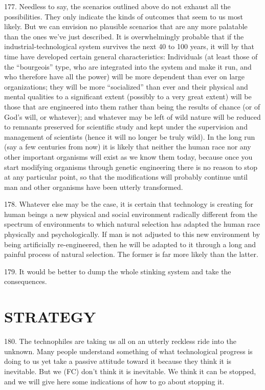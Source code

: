 \documentclass{article}
\begin{document}
177. Needless to say, the scenarios outlined above do not exhaust all the possibilities. They only 
indicate the kinds of outcomes that seem to us most likely. But we can envision no plausible 
scenarios that are any more palatable than the ones we’ve just described. It is overwhelmingly 
probable that if the industrial-technological system survives the next 40 to 100 years, it will by 
that time have developed certain general characteristics: Individuals (at least those of the 
“bourgeois” type, who are integrated into the system and make it run, and who therefore have all 
the power) will be more dependent than ever on large organizations; they will be more “socialized” 
than ever and their physical and mental qualities to a significant extent (possibly to a very great 
extent) will be those that are engineered into them rather than being the results of chance (or of 
God’s will, or whatever); and whatever may be left of wild nature will be reduced to remnants 
preserved for scientific study and kept under the supervision and management of scientists (hence 
it will no longer be truly wild). In the long run (say a few centuries from now) it is likely that 
neither the human race nor any other important organisms will exist as we know them today, 
because once you start modifying organisms through genetic engineering there is no reason to stop 
at any particular point, so that the modifications will probably continue until man and other 
organisms have been utterly transformed. \vspace{\baselineskip}

178. Whatever else may be the case, it is certain that technology is creating for human beings a 
new physical and social environment radically different from the spectrum of environments to 
which natural selection has adapted the human race physically and psychologically. If man is not 
adjusted to this new environment by being artificially re-engineered, then he will be adapted to it 
through a long and painful process of natural selection. The former is far more likely than the 
latter. \vspace{\baselineskip}

179. It would be better to dump the whole stinking system and take the consequences. 


\section{STRATEGY}

\hspace{0.5cm} 180. The technophiles are taking us all on an utterly reckless ride into the unknown. Many people 
understand something of what technological progress is doing to us yet take a passive attitude 
toward it because they think it is inevitable. But we (FC) don’t think it is inevitable. We think it 
can be stopped, and we will give here some indications of how to go about stopping it. \vspace{\baselineskip}
\end{document}
